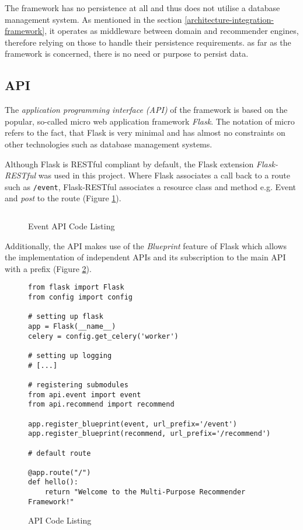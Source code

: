 The framework has no persistence at all and thus does not utilise a database management system. As mentioned in the section \ref{architecture-integration-framework}, it operates as middleware between domain and recommender engines, therefore relying on those to handle their persistence requirements. as far as the framework is concerned, there is no need or purpose to persist data.

\subsection{API}

The \emph{application programming interface (API)} of the framework is based on the popular, so-called micro web application framework \emph{Flask}. The notation of micro refers to the fact, that Flask is very minimal and has almost no constraints on other technologies such as database management systems.

Although Flask is RESTful compliant by default, the Flask extension \emph{Flask-RESTful} was used in this project. Where Flask associates a call back to a route such as \texttt{/event}, Flask-RESTful associates a resource class and method e.g. Event and \emph{post} to the route (Figure \ref{fig:implementation-framework-api-event}).

\begin{figure}[ht]
    \inputminted{py}{./includes/source/framework/api/event.py}
    \caption{Event API Code Listing}
    \label{fig:implementation-framework-api-event}
\end{figure}

Additionally, the API makes use of the \emph{Blueprint} feature of Flask which allows the implementation of independent APIs and its subscription to the main API with a prefix (Figure \ref{fig:implementation-framework-api}).

\begin{figure}[ht!]
    \begin{verbatim}
from flask import Flask
from config import config

# setting up flask
app = Flask(__name__)
celery = config.get_celery('worker')

# setting up logging
# [...]

# registering submodules
from api.event import event
from api.recommend import recommend

app.register_blueprint(event, url_prefix='/event')
app.register_blueprint(recommend, url_prefix='/recommend')

# default route

@app.route("/")
def hello():
    return "Welcome to the Multi-Purpose Recommender Framework!"
    \end{verbatim}
    \caption{API Code Listing}
    \label{fig:implementation-framework-api}
\end{figure}

